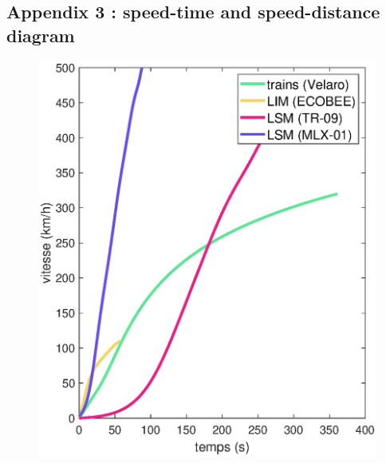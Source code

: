 \documentclass[12pt, a4paper, onecolumn]{article}
\begin{document}
\begin{appendix}
  \pagebreak %
  \subsection{Appendix 3 : speed-time and speed-distance diagram}
  \label{annexe 3}

  \begin{figure}[H]
    \centering
    \begin{minipage}[H]{0.49\textwidth}
      \includegraphics[width=\textwidth]{./fig/Atv.eps}
    \end{minipage}
    \hfill
    \begin{minipage}[H]{0.49\textwidth}

\end{minipage}
\end{figure}
\end{appendix}
\end{document}
